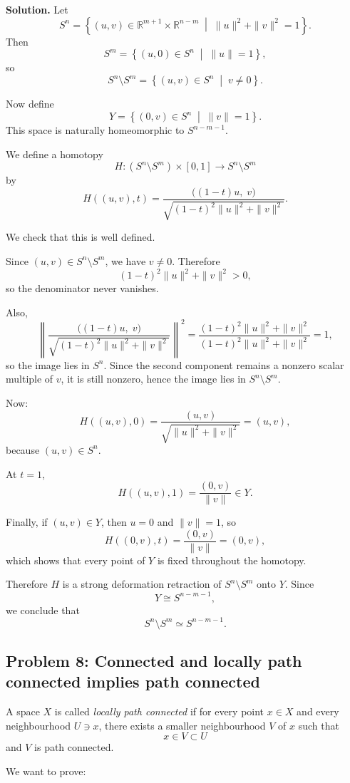 \documentclass[12pt,a4paper]{article}
\theoremstyle{notespace}
\begin{document}
\textbf{Solution.}
Let
\[
S^n
=
\left\{
(u,v)\in \mathbb{R}^{m+1}\times \mathbb{R}^{n-m}
\;\middle|\;
\|u\|^2+\|v\|^2=1
\right\}.
\]
Then
\[
S^m
=
\left\{
(u,0)\in S^n \;\middle|\; \|u\|=1
\right\},
\]
so
\[
S^n\setminus S^m
=
\left\{
(u,v)\in S^n \;\middle|\; v\neq 0
\right\}.
\]

Now define
\[
Y
=
\left\{
(0,v)\in S^n \;\middle|\; \|v\|=1
\right\}.
\]
This space is naturally homeomorphic to \(S^{n-m-1}\).

We define a homotopy
\[
H:(S^n\setminus S^m)\times [0,1]\to S^n\setminus S^m
\]
by
\[
H((u,v),t)
=
\frac{\bigl((1-t)u,\; v\bigr)}
{\sqrt{(1-t)^2\|u\|^2+\|v\|^2}}.
\]

We check that this is well defined.

Since \((u,v)\in S^n\setminus S^m\), we have \(v\neq 0\). Therefore
\[
(1-t)^2\|u\|^2+\|v\|^2 > 0,
\]
so the denominator never vanishes.

Also,
\[
\left\|
\frac{\bigl((1-t)u,\; v\bigr)}
{\sqrt{(1-t)^2\|u\|^2+\|v\|^2}}
\right\|^2
=
\frac{(1-t)^2\|u\|^2+\|v\|^2}
{(1-t)^2\|u\|^2+\|v\|^2}
=
1,
\]
so the image lies in \(S^n\). Since the second component remains a nonzero scalar multiple of \(v\), it is still nonzero, hence the image lies in \(S^n\setminus S^m\).

Now:
\[
H((u,v),0)
=
\frac{(u,v)}{\sqrt{\|u\|^2+\|v\|^2}}
=
(u,v),
\]
because \((u,v)\in S^n\).

At \(t=1\),
\[
H((u,v),1)
=
\frac{(0,v)}{\|v\|}
\in Y.
\]

Finally, if \((u,v)\in Y\), then \(u=0\) and \(\|v\|=1\), so
\[
H((0,v),t)
=
\frac{(0,v)}{\|v\|}
=
(0,v),
\]
which shows that every point of \(Y\) is fixed throughout the homotopy.

Therefore \(H\) is a strong deformation retraction of \(S^n\setminus S^m\) onto \(Y\). Since
\[
Y\cong S^{n-m-1},
\]
we conclude that
\[
S^n\setminus S^m \simeq S^{n-m-1}.
\]

\subsection{Problem 8: Connected and locally path connected implies path connected}

A space \(X\) is called \emph{locally path connected} if for every point \(x\in X\) and every neighbourhood \(U\ni x\), there exists a smaller neighbourhood \(V\) of \(x\) such that
\[
x\in V\subset U
\]
and \(V\) is path connected.

We want to prove:
\end{document}
